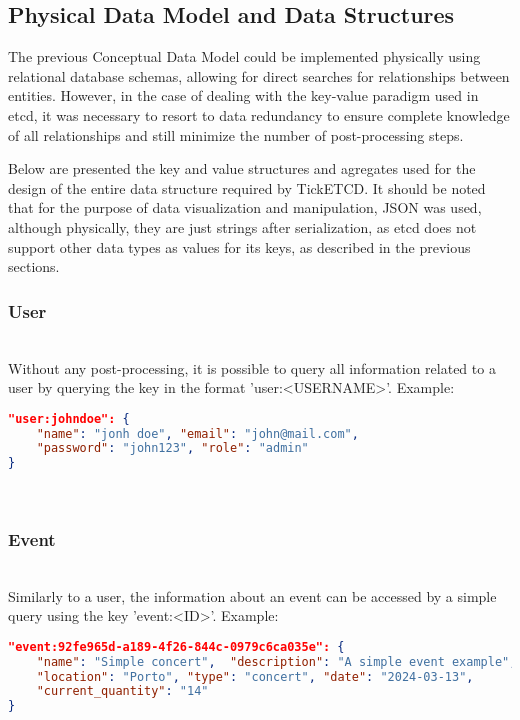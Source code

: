 \documentclass[screen,review]{acmart}
\begin{document}
\subsection{Physical Data Model and Data Structures}
The previous Conceptual Data Model could be implemented physically using relational database schemas, allowing for direct searches for relationships between entities. However, in the case of dealing with the key-value paradigm used in etcd, it was necessary to resort to data redundancy to ensure complete knowledge of all relationships and still minimize the number of post-processing steps.

Below are presented the key and value structures and agregates used for the design of the entire data structure required by TickETCD. It should be noted that for the purpose of data visualization and manipulation, JSON was used, although physically, they are just strings after serialization, as etcd does not support other data types as values for its keys, as described in the previous sections. \\

\subsubsection{User}~\\
Without any post-processing, it is possible to query all information related to a user by querying the key in the format 'user:<USERNAME>'. Example:

\begin{lstlisting}[language=json]
"user:johndoe": { 
    "name": "jonh doe", "email": "john@mail.com", 
    "password": "john123", "role": "admin"
}
\end{lstlisting}
\newline
\\ 
\subsubsection{Event}~\\
Similarly to a user, the information about an event can be accessed by a simple query using the key 'event:<ID>'. Example:

\begin{lstlisting}[language=json]
"event:92fe965d-a189-4f26-844c-0979c6ca035e": {
    "name": "Simple concert",  "description": "A simple event example", 
    "location": "Porto", "type": "concert", "date": "2024-03-13",
    "current_quantity": "14"
}
\end{lstlisting}\\
\end{document}
